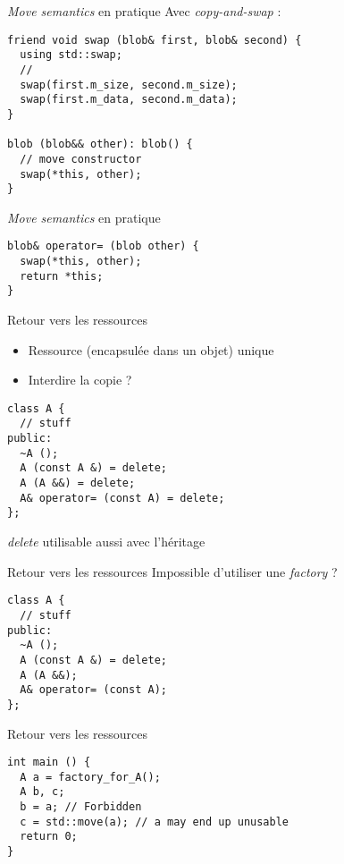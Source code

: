 \begin{frame}[fragile]{\textit{Move semantics} en pratique}
  Avec \textit{copy-and-swap} : 
  \begin{lstlisting}
friend void swap (blob& first, blob& second) {
  using std::swap;
  //
  swap(first.m_size, second.m_size);
  swap(first.m_data, second.m_data);
}

blob (blob&& other): blob() {
  // move constructor
  swap(*this, other);
}
  \end{lstlisting}
\end{frame}

\begin{frame}[fragile]{\textit{Move semantics} en pratique}
  \begin{lstlisting}
blob& operator= (blob other) {
  swap(*this, other);
  return *this;
}
  \end{lstlisting}
\end{frame}

\begin{frame}[fragile]{Retour vers les ressources}
  \begin{itemize}
  \item Ressource (encapsulée dans un objet) \og{}unique\fg{}
  \item Interdire la copie ?
  \end{itemize}
  \begin{lstlisting}
class A {
  // stuff
public:
  ~A ();
  A (const A &) = delete;
  A (A &&) = delete;
  A& operator= (const A) = delete;
};
  \end{lstlisting}
  \textit{delete} utilisable aussi avec l'héritage
\end{frame}

\begin{frame}[fragile]{Retour vers les ressources}
  Impossible d'utiliser une \textit{factory} ?
  \begin{lstlisting}
class A {
  // stuff
public:
  ~A ();
  A (const A &) = delete;
  A (A &&);
  A& operator= (const A);
};
  \end{lstlisting}
\end{frame}

\begin{frame}[fragile]{Retour vers les ressources}
  \begin{lstlisting}
int main () {
  A a = factory_for_A();
  A b, c;
  b = a; // Forbidden
  c = std::move(a); // a may end up unusable
  return 0;
}
  \end{lstlisting}
\end{frame}

